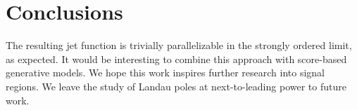 \section{Conclusions}\label{sec:conclusions}

The resulting jet function is trivially parallelizable in the strongly
ordered limit, as expected. It would be interesting to combine this
approach with score-based generative models. We hope this work inspires
further research into signal regions. We leave the study of Landau poles
at next-to-leading power to future work.

